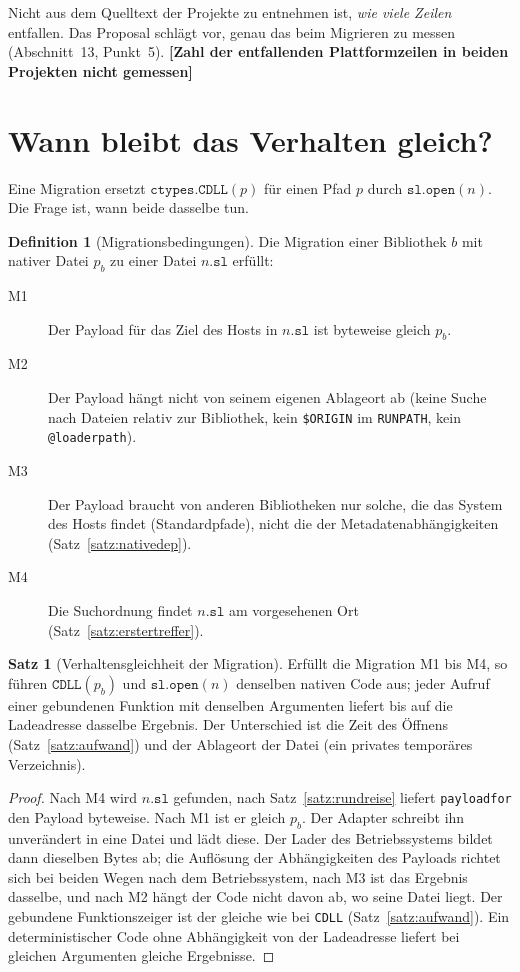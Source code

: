 \documentclass[a4paper,12pt,twoside]{report}
\DeclareRobustCommand{\_}{\ifmmode\mbox{\textunderscore}\else\textunderscore\allowbreak{}\fi}
\theoremstyle{definition}
\newtheorem{definition}{Definition}[chapter]
\newtheorem{satz}{Satz}[chapter]
\newcommand{\offen}[1]{\textcolor{accentred}{\textbf{[#1]}}}
\begin{document}
Nicht aus dem Quelltext der Projekte zu entnehmen ist, \emph{wie viele Zeilen} entfallen. Das Proposal schlägt vor, genau das beim Migrieren zu messen (Abschnitt~13, Punkt~5). \offen{Zahl der entfallenden Plattformzeilen in beiden Projekten nicht gemessen}

\section{Wann bleibt das Verhalten gleich?}

Eine Migration ersetzt $\mathtt{ctypes.CDLL}(p)$ für einen Pfad $p$ durch $\mathtt{sl.open}(n)$. Die Frage ist, wann beide dasselbe tun.

\begin{definition}[Migrationsbedingungen]
	\label{def:migration}
	Die Migration einer Bibliothek $b$ mit nativer Datei $p_b$ zu einer Datei $n.\texttt{sl}$ erfüllt:
	\begin{description}
		\item[M1] Der Payload für das Ziel des Hosts in $n.\texttt{sl}$ ist byteweise gleich $p_b$.
		\item[M2] Der Payload hängt nicht von seinem eigenen Ablageort ab (keine Suche nach Dateien relativ zur Bibliothek, kein \texttt{\$ORIGIN} im \texttt{RUNPATH}, kein \texttt{@loader\_path}).
		\item[M3] Der Payload braucht von anderen Bibliotheken nur solche, die das System des Hosts findet (Standardpfade), nicht die der Metadatenabhängigkeiten (Satz~\ref{satz:nativedep}).
		\item[M4] Die Suchordnung findet $n.\texttt{sl}$ am vorgesehenen Ort (Satz~\ref{satz:erstertreffer}).
	\end{description}
\end{definition}

\begin{satz}[Verhaltensgleichheit der Migration]
	\label{satz:migration}
	Erfüllt die Migration M1 bis M4, so führen $\mathtt{CDLL}(p_b)$ und $\mathtt{sl.open}(n)$ denselben nativen Code aus; jeder Aufruf einer gebundenen Funktion mit denselben Argumenten liefert bis auf die Ladeadresse dasselbe Ergebnis. Der Unterschied ist die Zeit des Öffnens (Satz~\ref{satz:aufwand}) und der Ablageort der Datei (ein privates temporäres Verzeichnis).
\end{satz}

\begin{proof}
	Nach M4 wird $n.\texttt{sl}$ gefunden, nach Satz~\ref{satz:rundreise} liefert \texttt{payload\_for} den Payload byteweise. Nach M1 ist er gleich $p_b$. Der Adapter schreibt ihn unverändert in eine Datei und lädt diese. Der Lader des Betriebssystems bildet dann dieselben Bytes ab; die Auflösung der Abhängigkeiten des Payloads richtet sich bei beiden Wegen nach dem Betriebssystem, nach M3 ist das Ergebnis dasselbe, und nach M2 hängt der Code nicht davon ab, wo seine Datei liegt. Der gebundene Funktionszeiger ist der gleiche wie bei \texttt{CDLL} (Satz~\ref{satz:aufwand}). Ein deterministischer Code ohne Abhängigkeit von der Ladeadresse liefert bei gleichen Argumenten gleiche Ergebnisse.
\end{proof}
\end{document}
